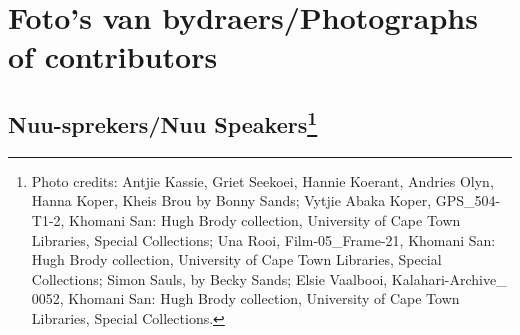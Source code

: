\let\Hy@footnote@currentHref\saved@Href@KJ
\addtocounter{footnote}{-1}

\let\Hy@footnote@currentHref\saved@Href@LE
\addtocounter{footnote}{1}
\makeatother

\newpage


\markboth{}{}
\section{Foto's van bydraers/Photographs of contributors}
\markboth{}{}

\markboth{}{}
\subsection*{N\textipa{\textvertline}uu-sprekers/N\textipa{\textvertline}uu
Speakers\footnote{Photo credits: Antjie Kassie, Griet Seekoei, Hannie
Koerant, Andries Olyn, Hanna Koper, Kheis Brou by Bonny Sands; Vytjie
\textipa{\textvertline}Abaka Koper, GPS\_504-T1-2,
\textipa{\textdoublebarpipe}Khomani San: Hugh Brody collection,
University of Cape Town Libraries, Special Collections;
\textipa{\textvertline}Una Rooi, Film-05\_Frame-21,
\textipa{\textdoublebarpipe}Khomani San: Hugh Brody collection,
University of Cape Town Libraries, Special Collections; Simon Sauls,
by Becky Sands; Elsie Vaalbooi, Kalahari-Archive\_ 0052,
\textipa{\textdoublebarpipe}Khomani San: Hugh Brody collection,
University of Cape Town Libraries, Special Collections.}}
\markboth{}{}

